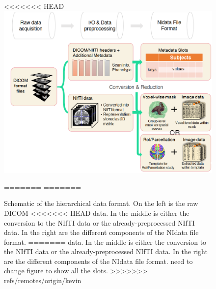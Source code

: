 \documentclass{nature}
\begin{document}
\begin{figure}[tb]
\centering
<<<<<<< HEAD
\includegraphics[width=400pt]{fig/brainconductor/file_format.png}
\caption{Schematic of the hierarchical data format. On the left is the raw DICOM
<<<<<<< HEAD
data. In the middle is either the conversion to the NIfTI data or the already-preprocessed
NIfTI data. In the right are the different components of the NIdata file format. %
=======
data. In the middle is either the conversion to the NIfTI data or the
already-preprocessed
NIfTI data. In the right are the different components of the NIdata file format.
{\color{red}need to change figure to show all the slots. }
>>>>>>> refs/remotes/origin/kevin
}
=======
=======


\end{figure}
\end{document}
